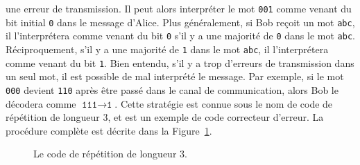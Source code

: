 une erreur de transmission. Il peut alors interpréter le mot \texttt{001} comme
venant du bit initial \texttt{0} dans le message d'Alice. Plus généralement, si
Bob reçoit un mot \texttt{abc}, il l'interprétera comme venant du bit
\texttt{0} s'il y a une majorité de \texttt{0} dans le mot \texttt{abc}.
Réciproquement, s'il y a une majorité de \texttt{1} dans le mot
\texttt{abc}, il l'interprétera comme venant du bit \texttt{1}. Bien entendu,
s'il y a trop d'erreurs de transmission dans un seul mot, il est possible de mal
interprété le message. Par exemple, si le mot \texttt{000} devient
\texttt{110} après être passé dans le canal de communication, alors Bob
le décodera comme $\texttt{111}\to\texttt{1}$. Cette stratégie est connue sous
le nom de code de répétition de longueur $3$, et est un exemple de code
correcteur d'erreur. La procédure complète est décrite dans la
Figure~\ref{fig:rep3}.
\begin{figure}[h]
  \centering
  \caption{Le code de répétition de longueur $3$.}
  \label{fig:rep3}
\end{figure}
